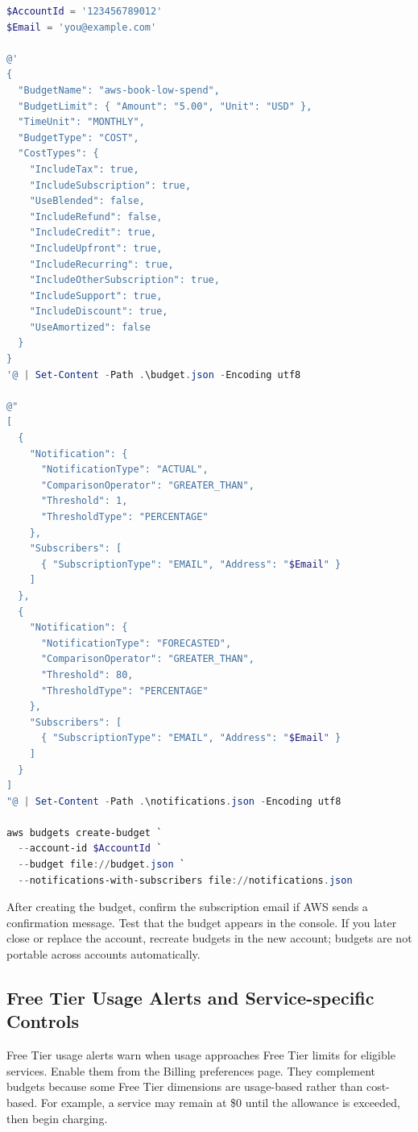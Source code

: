 \begin{lstlisting}[language=PowerShell,caption={Creating an AWS Budget with actual and forecasted email alerts.},label={lst:create-budget}]
$AccountId = '123456789012'
$Email = 'you@example.com'

@'
{
  "BudgetName": "aws-book-low-spend",
  "BudgetLimit": { "Amount": "5.00", "Unit": "USD" },
  "TimeUnit": "MONTHLY",
  "BudgetType": "COST",
  "CostTypes": {
    "IncludeTax": true,
    "IncludeSubscription": true,
    "UseBlended": false,
    "IncludeRefund": false,
    "IncludeCredit": true,
    "IncludeUpfront": true,
    "IncludeRecurring": true,
    "IncludeOtherSubscription": true,
    "IncludeSupport": true,
    "IncludeDiscount": true,
    "UseAmortized": false
  }
}
'@ | Set-Content -Path .\budget.json -Encoding utf8

@"
[
  {
    "Notification": {
      "NotificationType": "ACTUAL",
      "ComparisonOperator": "GREATER_THAN",
      "Threshold": 1,
      "ThresholdType": "PERCENTAGE"
    },
    "Subscribers": [
      { "SubscriptionType": "EMAIL", "Address": "$Email" }
    ]
  },
  {
    "Notification": {
      "NotificationType": "FORECASTED",
      "ComparisonOperator": "GREATER_THAN",
      "Threshold": 80,
      "ThresholdType": "PERCENTAGE"
    },
    "Subscribers": [
      { "SubscriptionType": "EMAIL", "Address": "$Email" }
    ]
  }
]
"@ | Set-Content -Path .\notifications.json -Encoding utf8

aws budgets create-budget `
  --account-id $AccountId `
  --budget file://budget.json `
  --notifications-with-subscribers file://notifications.json
\end{lstlisting}

After creating the budget, confirm the subscription email if AWS sends a confirmation message. Test that the budget appears in the console. If you later close or replace the account, recreate budgets in the new account; budgets are not portable across accounts automatically.

\subsection{Free Tier Usage Alerts and Service-specific Controls}
Free Tier usage alerts warn when usage approaches Free Tier limits for eligible services. Enable them from the Billing preferences page. They complement budgets because some Free Tier dimensions are usage-based rather than cost-based. For example, a service may remain at \$0 until the allowance is exceeded, then begin charging.

